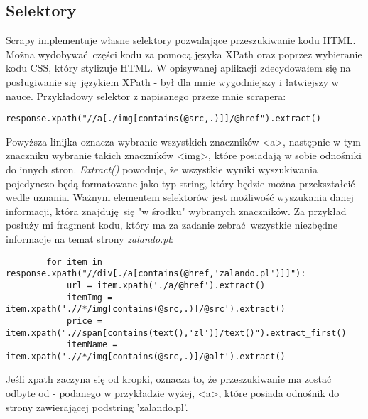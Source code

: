 \subsection{Selektory}
Scrapy implementuje własne selektory pozwalające przeszukiwanie kodu HTML.
Można wydobywać części kodu za pomocą języka XPath oraz poprzez wybieranie kodu CSS, który stylizuje HTML.
W opisywanej aplikacji zdecydowałem się na posługiwanie się językiem XPath - był dla mnie wygodniejszy i łatwiejszy w nauce.
Przykładowy selektor z napisanego przeze mnie scrapera:
\begin{lstlisting}
response.xpath("//a[./img[contains(@src,.)]]/@href").extract()
\end{lstlisting}
Powyższa linijka oznacza wybranie wszystkich znaczników \textless a\textgreater, następnie w tym znaczniku wybranie takich znaczników \textless img\textgreater, które posiadają w sobie odnośniki do innych stron. 
\emph{Extract()} powoduje, że wszystkie wyniki wyszukiwania pojedynczo będą formatowane jako typ string, który będzie można przekształcić wedle uznania.
Ważnym elementem selektorów jest możliwość wyszukania danej informacji, która znajduję się "w środku" wybranych znaczników.
Za przykład posłuży mi fragment kodu, który ma za zadanie zebrać wszystkie niezbędne informacje na temat strony \emph{zalando.pl}:
\begin{lstlisting}
        for item in response.xpath("//div[./a[contains(@href,'zalando.pl')]]"):
            url = item.xpath('./a/@href').extract()
            itemImg = item.xpath('.//*/img[contains(@src,.)]/@src').extract()
            price = item.xpath(".//span[contains(text(),'zl')]/text()").extract_first()
            itemName = item.xpath('.//*/img[contains(@src,.)]/@alt').extract()
\end{lstlisting}

Jeśli xpath zaczyna się od kropki, oznacza to, że przeszukiwanie ma zostać odbyte od - podanego w przykładzie wyżej, \textless a\textgreater, które posiada odnośnik do strony zawierającej podstring 'zalando.pl'.

